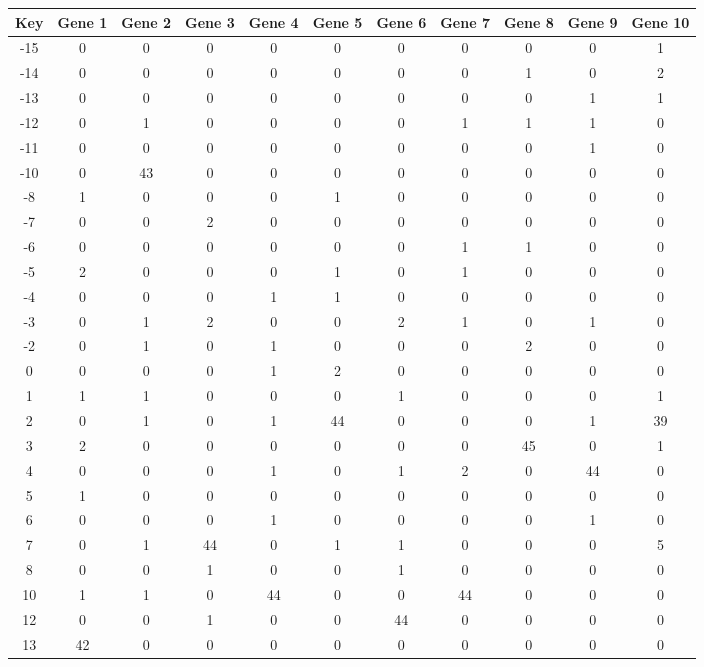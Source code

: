\begin{tabular}{|c|c|c|c|c|c|c|c|c|c|c|}
\hline
Key & Gene 1 & Gene 2 & Gene 3 & Gene 4 & Gene 5 & Gene 6 & Gene 7 & Gene 8 & Gene 9 & Gene 10 \\
\hline
-15 & 0 & 0 & 0 & 0 & 0 & 0 & 0 & 0 & 0 & 1 \\
-14 & 0 & 0 & 0 & 0 & 0 & 0 & 0 & 1 & 0 & 2 \\
-13 & 0 & 0 & 0 & 0 & 0 & 0 & 0 & 0 & 1 & 1 \\
-12 & 0 & 1 & 0 & 0 & 0 & 0 & 1 & 1 & 1 & 0 \\
-11 & 0 & 0 & 0 & 0 & 0 & 0 & 0 & 0 & 1 & 0 \\
-10 & 0 & 43 & 0 & 0 & 0 & 0 & 0 & 0 & 0 & 0 \\
-8 & 1 & 0 & 0 & 0 & 1 & 0 & 0 & 0 & 0 & 0 \\
-7 & 0 & 0 & 2 & 0 & 0 & 0 & 0 & 0 & 0 & 0 \\
-6 & 0 & 0 & 0 & 0 & 0 & 0 & 1 & 1 & 0 & 0 \\
-5 & 2 & 0 & 0 & 0 & 1 & 0 & 1 & 0 & 0 & 0 \\
-4 & 0 & 0 & 0 & 1 & 1 & 0 & 0 & 0 & 0 & 0 \\
-3 & 0 & 1 & 2 & 0 & 0 & 2 & 1 & 0 & 1 & 0 \\
-2 & 0 & 1 & 0 & 1 & 0 & 0 & 0 & 2 & 0 & 0 \\
0 & 0 & 0 & 0 & 1 & 2 & 0 & 0 & 0 & 0 & 0 \\
1 & 1 & 1 & 0 & 0 & 0 & 1 & 0 & 0 & 0 & 1 \\
2 & 0 & 1 & 0 & 1 & 44 & 0 & 0 & 0 & 1 & 39 \\
3 & 2 & 0 & 0 & 0 & 0 & 0 & 0 & 45 & 0 & 1 \\
4 & 0 & 0 & 0 & 1 & 0 & 1 & 2 & 0 & 44 & 0 \\
5 & 1 & 0 & 0 & 0 & 0 & 0 & 0 & 0 & 0 & 0 \\
6 & 0 & 0 & 0 & 1 & 0 & 0 & 0 & 0 & 1 & 0 \\
7 & 0 & 1 & 44 & 0 & 1 & 1 & 0 & 0 & 0 & 5 \\
8 & 0 & 0 & 1 & 0 & 0 & 1 & 0 & 0 & 0 & 0 \\
10 & 1 & 1 & 0 & 44 & 0 & 0 & 44 & 0 & 0 & 0 \\
12 & 0 & 0 & 1 & 0 & 0 & 44 & 0 & 0 & 0 & 0 \\
13 & 42 & 0 & 0 & 0 & 0 & 0 & 0 & 0 & 0 & 0 \\
\hline
\end{tabular}